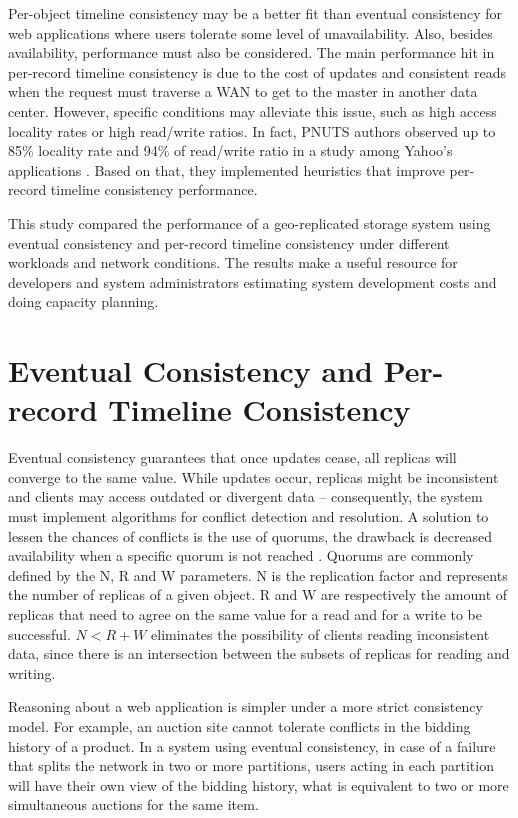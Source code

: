 \documentclass[doublespacing]{bmcart}
\begin{document}
Per-object timeline consistency may be a better fit than eventual consistency for web
applications where users tolerate some level of unavailability. Also,
besides availability, performance must also be considered. The main performance
hit in per-record timeline consistency is due to the cost of updates and consistent reads
when the request must traverse a WAN to get to the master in another data
center. However, specific conditions may alleviate this issue, such as high
access locality rates or high read/write ratios. In fact, PNUTS authors observed
up to 85\% locality rate and 94\% of read/write ratio in a study among Yahoo's
applications \cite{Cooper2008, Kadambi2011}. Based on that, they implemented
heuristics that improve per-record timeline consistency performance.

This study compared the performance of a geo-replicated storage system using
eventual consistency and per-record timeline consistency under different workloads and
network conditions. The results make a useful resource for developers and system
administrators estimating system development costs and doing capacity planning.

\section{Eventual Consistency and Per-record Timeline Consistency}

Eventual consistency guarantees that once updates cease, all replicas will converge to the same value. While updates occur, replicas might be
inconsistent and clients may access outdated or divergent data -- consequently,
the system must implement algorithms for conflict detection and resolution. A
solution to lessen the chances of conflicts is the use of quorums, the
drawback is decreased availability when a specific quorum is not reached
\cite{Vogels2009}. Quorums are commonly defined by the N, R and W parameters. N is
the replication factor and represents the number of replicas of a given object.
R and W are respectively the amount of replicas that need to agree on the same value for a
read and for a write to be successful. $N < R + W$ eliminates the possibility of
clients reading inconsistent data, since there is an intersection between the
subsets of replicas for reading and writing.

Reasoning about a web application is simpler under a more strict consistency model. For
example, an auction site cannot tolerate conflicts in the bidding history of a
product. In a system using eventual consistency, in case of a failure that
splits the network in two or more partitions, users acting in each partition will have their
own view of the bidding history, what is equivalent to two or more simultaneous auctions
for the same item.
\end{document}
